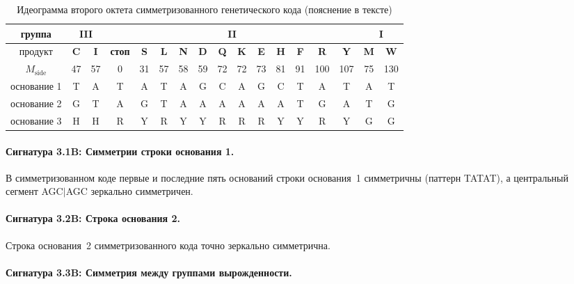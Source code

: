 \documentclass[12pt]{article}
\begin{document}
\begin{table}[htbp]
\centering
\caption{Идеограмма второго октета симметризованного генетического кода (пояснение в тексте)}
\label{tab:ideogram_symm}
\footnotesize
\begin{tabular}{|c|c|c|c|c|c|c|c|c|c|c|c|c|c|c|c|c|}
\hline
группа & \multicolumn{2}{c|}{\textbf{III}} & \multicolumn{12}{c|}{\textbf{II}} & \multicolumn{2}{c|}{\textbf{I}} \\
\hline
продукт & \textbf{C} & \textbf{I} & \textbf{стоп} & \textbf{S} & \textbf{L} & \textbf{N} & \textbf{D} & \textbf{Q} & \textbf{K} & \textbf{E} & \textbf{H} & \textbf{F} & \textbf{R} & \textbf{Y} & \textbf{M} & \textbf{W} \\
$M_{\text{side}}$ & 47 & 57 & 0 & 31 & 57 & 58 & 59 & 72 & 72 & 73 & 81 & 91 & 100 & 107 & 75 & 130 \\
\hline
основание 1 & T & A & T & A & T & A & G & C & A & G & C & T & A & T & A & T \\
основание 2 & G & T & A & G & T & A & A & A & A & A & A & T & G & A & T & G \\
основание 3 & H & H & R & Y & R & Y & Y & R & R & R & Y & Y & R & Y & G & G \\
\hline
\end{tabular}
\end{table}

\paragraph{Сигнатура 3.1B: Симметрии строки основания 1.} В симметризованном коде первые и последние пять оснований строки основания~1 симметричны (паттерн TATAT), а центральный сегмент AGC$|$AGC зеркально симметричен.

\paragraph{Сигнатура 3.2B: Строка основания 2.} Строка основания~2 симметризованного кода точно зеркально симметрична.

\paragraph{Сигнатура 3.3B: Симметрия между группами вырожденности.}
\end{document}
